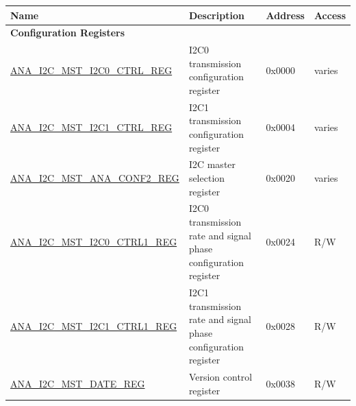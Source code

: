 \begin{longtable}{ | p{6cm} | p{7.2cm} | p{1.3cm} | p{1cm} | }
\hline\rowcolor{lightgray}
Name & Description &  Address & Access \\ \hline
\endhead
\multicolumn{4}{|l|}{\textbf{Configuration Registers}} \\ \hline
\hyperref[regdesc:ANAI2CMSTI2C0CTRLREG]{ANA\_I2C\_MST\_I2C0\_CTRL\_REG} & I2C0 transmission configuration register & 0x0000 & varies \\ \hline
\hyperref[regdesc:ANAI2CMSTI2C1CTRLREG]{ANA\_I2C\_MST\_I2C1\_CTRL\_REG} & I2C1 transmission configuration register & 0x0004 & varies \\ \hline
\hyperref[regdesc:ANAI2CMSTANACONF2REG]{ANA\_I2C\_MST\_ANA\_CONF2\_REG} & I2C master selection register & 0x0020 & varies \\ \hline
\hyperref[regdesc:ANAI2CMSTI2C0CTRL1REG]{ANA\_I2C\_MST\_I2C0\_CTRL1\_REG} & I2C0 transmission rate and signal phase configuration register & 0x0024 & R/W \\ \hline
\hyperref[regdesc:ANAI2CMSTI2C1CTRL1REG]{ANA\_I2C\_MST\_I2C1\_CTRL1\_REG} & I2C1 transmission rate and signal phase configuration register & 0x0028 & R/W \\ \hline
\hyperref[regdesc:ANAI2CMSTDATEREG]{ANA\_I2C\_MST\_DATE\_REG} & Version control register & 0x0038 & R/W \\ \hline
\end{longtable}
